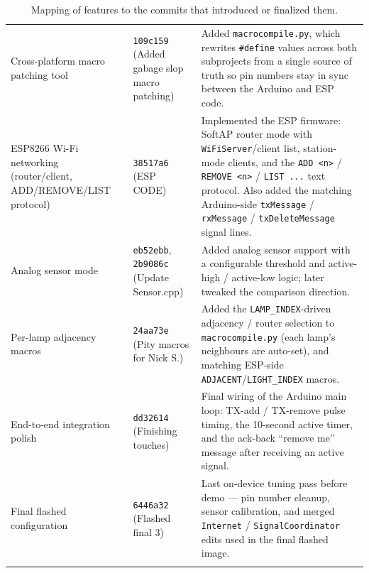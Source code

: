 \documentclass[11pt]{article}
\begin{document}
\begin{longtable}{>{\raggedright\arraybackslash}p{}
                  >{\raggedright\arraybackslash}p{}
                  >{\raggedright\arraybackslash}p{}}
Cross-platform macro patching tool &
\texttt{109c159} \newline (Added gabage slop macro patching) &
Added \texttt{macrocompile.py}, which rewrites \texttt{\#define} values across both subprojects from a single source of truth so pin numbers stay in sync between the Arduino and ESP code. \\

ESP8266 Wi-Fi networking (router/client, ADD/REMOVE/LIST protocol) &
\texttt{38517a6} \newline (ESP CODE) &
Implemented the ESP firmware: SoftAP router mode with \texttt{WiFiServer}/client list, station-mode clients, and the \texttt{ADD <n>} / \texttt{REMOVE <n>} / \texttt{LIST ...} text protocol. Also added the matching Arduino-side \texttt{txMessage} / \texttt{rxMessage} / \texttt{txDeleteMessage} signal lines. \\

Analog sensor mode &
\texttt{eb52ebb}, \texttt{2b9086c} \newline (Update Sensor.cpp) &
Added analog sensor support with a configurable threshold and active-high / active-low logic; later tweaked the comparison direction. \\

Per-lamp adjacency macros &
\texttt{24aa73e} \newline (Pity macros for Nick S.) &
Added the \texttt{LAMP\_INDEX}-driven adjacency / router selection to \texttt{macrocompile.py} (each lamp's neighbours are auto-set), and matching ESP-side \texttt{ADJACENT}/\texttt{LIGHT\_INDEX} macros. \\

End-to-end integration polish &
\texttt{dd32614} \newline (Finishing touches) &
Final wiring of the Arduino main loop: TX-add / TX-remove pulse timing, the 10-second active timer, and the ack-back ``remove me'' message after receiving an active signal. \\

Final flashed configuration &
\texttt{6446a32} \newline (Flashed final 3) &
Last on-device tuning pass before demo --- pin number cleanup, sensor calibration, and merged \texttt{Internet} / \texttt{SignalCoordinator} edits used in the final flashed image. \\

\bottomrule
\caption{Mapping of features to the commits that introduced or finalized them.}
\label{tab:commits}
\end{longtable}
\end{document}
